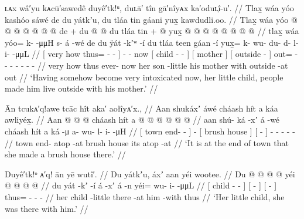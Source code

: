 \ex\label{ex:89-108-son-sick-forced-out}%
%
\begingl
	\glpreamble	ʟᴀx wâ′yu kᴀcū′sawedê duyê′tk!ᵘ, duʟā′ tîn gā′nîyᴀx ka′oduʟ̣î-u′. //
	\glpreamble	Tlax̱ wáa yóo kashóo sáwé de du yátkʼu, du tláa tin gáani yux̱ kawdudli.oo. //
	\gla	{} Tlax̱ wáa yóo @  @ {} @ {} @ {} @ {} {}
		 @ {} @ {} de +
		{} du  @ {} @ {} {}
		{} du tláa tin {} +
		{}  @ {} {}
		yux̱ @  @ {} @ {} @ {} @ {} @ {} @ {} @ {} //
	\glb	{} tlax̱ wáa yóo= k- {}  -μμH {} {}
		s- á -wé de
		{} du ÿát -kʼʷ -í {}
		{} du tláa teen {}
		{} gáan -í {}
		yux̱= k- wu- du- d- l- i-  -μμL //
	\glc	{}[ very how thus= - \·  - \· {}]
		-  - now
		{}[  child - - {}]
		{}[  mother  {}]
		{}[ outside - {}]
		out= - - - - - -  - //
	\gld	{} very how thus  {} {} {} {} {}
		ever-  {} now
		{} her son -little {} {}
		{} his mother with {}
		{} outside -at {}
		out\•  {} {} {} {} {} {} {} //
	\glft	‘Having somehow become very intoxicated now, her little child,
		people made him live outside with his mother.’
		//
\endgl
\xe

\ex\label{ex:89-109-made-brush-house}%
%
\begingl
	\glpreamble	Ān tcukᴀ′q!awe tcāc hît aka′ aołîyᴀ′x., //
	\glpreamble	Aan shukáxʼ áwé cháash hít a káa awliyéx̱. //
	\gla	{} Aan  @ {} @ {} {}  @ {}
		{} cháash hít {}
		{} a  @ {} {}
		 @ {} @ {} @ {} @ {} @ {} //
	\glb	{} aan shú- ká -xʼ {} á -wé
		{} cháash hít {}
		{} a ká -μ {}
		a- wu- l- i-  -μH //
	\glc	{}[ town end-  - {}]  -
		{}[ brush house {}]
		{}[   - {}]
		- - - -  - //
	\gld	{} town end- atop -at {}  {}
		{} brush house {}
		{} its atop -at {}
		 {} {} {} {} {} //
	\glft	‘It is at the end of town that she made a brush house there.’
		//
\endgl
\xe

\ex\label{ex:89-110-live-there-with-child}%
%
\begingl
	\glpreamble	Duyê′tk!ᵒ ᴀ′q! ān yē wutî′. //
	\glpreamble	Du yátkʼu, áxʼ aan yéi wootee. //
	\gla	{} Du  @ {} @ {} {}
		{}  @ {} {}
		{}  @ {} {}
		yéi @  @ {} @ {} @ {} //
	\glb	{} du yát -kʼ -í {}
		{} á -xʼ {}
		{} á -n {}
		yéi= wu- i-  -μμL //
	\glc	{}[  child - - {}]
		{}[  - {}]
		{}[  - {}]
		thus= - -  - //
	\gld	{} her child -little {} {}
		{} there -at {}
		{} him -with {}
		thus\•  {} {} {} //
	\glft	‘Her little child, she was there with him.’
		//
\endgl
\xe

